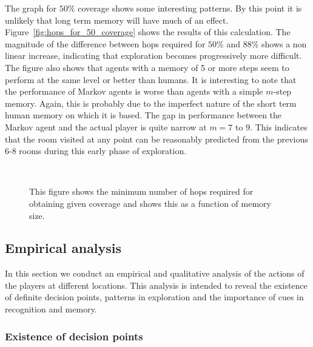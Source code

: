 The graph for $50\%$ coverage shows some interesting patterns. By this point it is unlikely that long term memory will have much of an effect. Figure~\ref{fig:hops_for_50_coverage} shows the results of this calculation. The magnitude of the difference between hops required for $50\%$ and $88\%$ shows a non linear increase, indicating that exploration becomes progressively more difficult. The figure also shows that agents with a memory of 5 or more steps seem to perform at the same level or better than humans. It is interesting to note that the performance of Markov agents is worse than agents with a simple $m$-step memory. Again, this is probably due to the imperfect nature of the short term human memory on which it is based. The gap in performance between the Markov agent and the actual player is quite narrow at $m = 7$ to $9$. This indicates that the room visited at any point can be reasonably predicted from the previous 6-8 rooms during this early phase of exploration.


\begin{figure*}[tb]
    \centering
   \\

    \caption{This figure shows the minimum number of hops required for obtaining given coverage and shows this as a function of memory size.}
\end{figure*}





\subsection{Empirical analysis} %
\label{sec:empiricalanalysis}

In this section we conduct an empirical and qualitative analysis of the actions of the players at different locations. This analysis is intended to reveal the existence of definite decision points, patterns in exploration and the importance of cues in recognition and memory.



\subsubsection{Existence of decision points} %
\label{sec:definite_decision_points}

